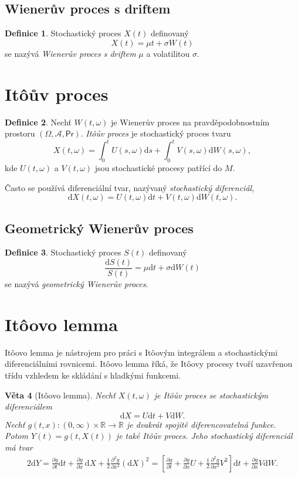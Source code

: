 \documentclass[a4paper,12pt]{report}
\newtheorem{veta}{Věta}
\theoremstyle{definition} \newtheorem{definice}[veta]{Definice}
\theoremstyle{remark}
\begin{document}
\subsection{Wienerův proces s driftem}
\begin{definice}
Stochastický proces $X(t)$ definovaný 
$$X(t)  = \mu t + \sigma W (t)$$
se nazývá \textit{Wienerův proces  s driftem} $\mu$ a volatilitou $\sigma$.
\end{definice}

\section{It\^oův proces}

\begin{definice}
Nechť $W(t,\omega)$ je Wienerův proces na pravděpodobnostním prostoru $(\Omega,\mathcal{A},\mathsf{Pr})$.
\textit{It\^oův proces} je stochastický proces tvaru
$$X(t,\omega)=\int_0^tU(s,\omega)\mathrm{d}s+\int_0^tV(s,\omega)\mathrm{d}W(s,\omega),$$
kde $U(t,\omega)$ a $V(t,\omega)$ jsou stochastické procesy patřící do $M$.

Často se používá diferenciální tvar, nazývaný \textit{stochastický diferenciál},
$$\mathrm{d}X(t,\omega)=U(t,\omega)\mathrm{d}t+V(t,\omega)\mathrm{d}W(t,\omega).$$
\end{definice}


\subsection{Geometrický Wienerův proces}
\begin{definice}
Stochastický proces $S(t)$ definovaný 
$$\frac{\mathrm{d} S(t)}{S(t)} = \mu\mathrm{d}t + \sigma\mathrm{d}W (t)$$
se nazývá \textit{geometrický Wienerův proces}.
\end{definice}

\section{It\^oovo lemma}
It\^oovo lemma je nástrojem pro práci s It\^oovým integrálem a stochastickými diferenciálními rovnicemi.
It\^oovo lemma říká, že It\^oovy procesy tvoří uzavřenou třídu vzhledem ke skládání s hladkými funkcemi.

\begin{veta}[It\^oovo lemma]
Nechť $X(t,\omega)$ je It\^oův proces se stochastickým diferenciálem
$$\mathrm{d}X=U\mathrm{d}t+V\mathrm{d}W.$$
Nechť $g(t,x):(0,\infty)\times\mathbb R\to\mathbb R$ je dvakrát spojitě diferencovatelná funkce.
Potom $Y(t)=g(t,X(t))$ je také It\^oův proces.
Jeho stochastický diferenciál má tvar
\begin{alignat*}{2}
\mathrm{d}Y=\frac{\partial g}{\partial t}\mathrm{d}t+\frac{\partial g}{\partial x}\,\mathrm{d}X+\frac12\frac{\partial^2 g}{\partial x^2}(\mathrm{d}X)^2=\left[\frac{\partial g}{\partial t}+\frac{\partial g}{\partial x}U+\frac12\frac{\partial^2 g}{\partial x^2}V^2\right]\mathrm{d}t+\frac{\partial g}{\partial x}V\mathrm{d}W.
\end{alignat*}
\end{veta}
\end{document}
